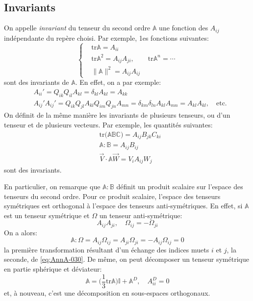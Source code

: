 \subsection{Invariants}
On appelle \emph{invariant} du tenseur du second ordre $\mathbb{A}$ une fonction des $A_{ij}$ indépendante du repère choisi.
Par exemple, 1es fonctions suivantes:
\begin{equation}
    \left\{
    \begin{aligned}
        & \mathrm{tr} \mathbb{A} = A_{ii} \\
        & \mathrm{tr} \mathbb{A}^2 = A_{ij} A_{ji} , \qquad \mathrm{tr} \mathbb{A}^n = \cdots \\
        & \| \mathbb{A} \|^2 = A_{ij} A_{ij}
    \end{aligned}
    \right.
    \label{eq:AnnA-028}
\end{equation}
sont des invariants de $\mathbb{A}$.
En effet, on a par exemple:
\begin{align*}
   & A_{ii}' = Q_{ik} Q_{il} A_{kl} = \delta_{kl} A_{kl} = A_{kk} \\
    &    A_{ij}' A_{ij}' = Q_{ik} Q_{jl} A_{kl} Q_{im} Q_{jn} A_{mn}= \delta_{km} \delta_{ln} A_{kl} A_{mn} = A_{kl} A_{kl},\quad \text{etc.}
    \end{align*}
On définit de la même manière les invariants de plusieurs tenseurs, ou d'un tenseur et de plusieurs vecteurs.
Par exemple, les quantités suivantes:
\begin{equation}
    \begin{aligned}
       & \mathrm{tr} \bigl( \mathbb{A} \mathbb{B} \mathbb{C} \bigr) = A_{ij} B_{jk} C_{ki} \\
       & \mathbb{A} : \mathbb{B} = A_{ij} B_{ij} \\
       & \vec{V}\cdot \mathbb{A} \vec{W} = V_{i} A_{ij} W_j
    \end{aligned}
    \label{eq:AnnA-029}
\end{equation}
sont des invariants.

En particulier, on remarque que $\mathbb{A}:\mathbb{B}$ définit un produit scalaire sur l'espace des tenseurs du second ordre.
Pour ce produit scalaire, l'espace des tenseurs symétriques est orthogonal à l'espace des tenseurs anti-symétriques.
En effet, si $\mathbb{A}$ est un tenseur symétrique et $\mathbb{\Omega}$ un tenseur anti-symétrique:
\begin{equation}
    A_{ij} A_{ji},\quad \Omega_{ij} = -\Omega_{ji}
    \label{eq:AnnA-030}
\end{equation}
On a alors: 
\begin{equation}
    \mathbb{A}:\mathbb{\Omega} = A_{ij} \Omega_{ij} = A_{ji} \Omega_{ji} = -A_{ij} \Omega_{ij} = 0
    \label{eq:AnnA-031}
\end{equation}
la première transformation résultant d'un échange des indices muets $i$ et $j$, la seconde, de \eqref{eq:AnnA-030}.
De même, on peut décomposer un tenseur symétrique en partie sphérique et déviateur:
\begin{equation}
    \mathbb{A} = \bigl( \frac{1}{3} \mathrm{tr} \mathbb{A} \bigr) \mathbb{I} + \mathbb{A}^D , \quad A_{ii}^D = 0
    \label{eq:AnnA-032}
\end{equation}
et, à nouveau, c'est une décomposition en sous-espaces orthogonaux.
